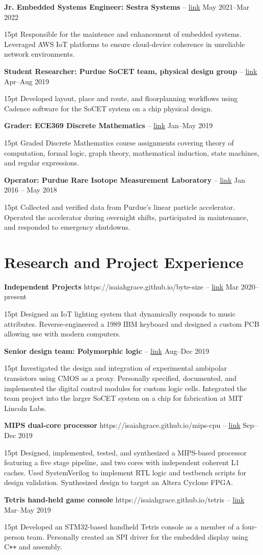 \documentclass[10pt,letterpaper]{article}
\newcommand{\resumeItem}[4]{
	\begingroup
	\def\link{#2}
	\textbf{#1}
	\ifx\link\empty \else 
		-- \href{#2}{link}
	\fi
	\hfill #3\\
	\begin{adjustwidth}{15pt}{}
	#4
	\end{adjustwidth}
	\endgroup
}
\begin{document}
\resumeItem
{Jr. Embedded Systems Engineer: Sestra Systems}
{}
{May 2021--Mar 2022}
{Responsible for the maintence and enhancement of embedded systems. Leveraged AWS IoT platforms to ensure cloud-device coherence in unreliable network environments.}

\resumeItem
{Student Researcher: Purdue SoCET team, physical design group}
{}
{Apr--Aug 2019}
{Developed layout, place and route, and floorplanning workflows using Cadence software for the SoCET system on a chip physical design.}

\resumeItem
{Grader: ECE369 Discrete Mathematics}
{}
{Jan--May 2019}
{Graded Discrete Mathematics course assignments covering theory of computation, formal logic, graph theory, mathematical induction, state machines, and regular expressions.}

\resumeItem
{Operator: Purdue Rare Isotope Measurement Laboratory}
{}
{Jan 2016 -- May 2018}
{Collected and verified data from Purdue's linear particle accelerator. Operated the accelerator during overnight shifts, participated in maintenance, and responded to emergency shutdowns.}

\section*{Research and Project Experience}
\resumeItem
{Independent Projects}
{https://isaiahgrace.github.io/byte-size}
{Mar 2020--present}
{Designed an IoT lighting system that dynamically responds to music attributes. Reverse-engineered a 1989 IBM keyboard and designed a custom PCB allowing use with modern computers.}

\resumeItem
{Senior design team: Polymorphic logic}
{}
{Aug--Dec 2019}
{Investigated the design and integration of experimental ambipolar transistors using CMOS as a proxy. Personally specified, documented, and implemented the digital control modules for custom logic cells. Integrated the team project into the larger SoCET system on a chip for fabrication at MIT Lincoln Labs.}

\resumeItem
{MIPS dual-core processor}
{https://isaiahgrace.github.io/mips-cpu}
{Sep--Dec 2019}
{Designed, implemented, tested, and synthesized a MIPS-based processor featuring a five stage pipeline, and two cores with independent coherent L1 caches. Used SystemVerilog to implement RTL logic and testbench scripts for design validation. Synthesized design to target an Altera Cyclone FPGA.}

\resumeItem
{Tetris hand-held game console}
{https://isaiahgrace.github.io/tetris}
{Mar--May 2019}
{Developed an STM32-based handheld Tetris console as a member of a four-person team. Personally created an SPI driver for the embedded display using C\texttt{++} and assembly.}
\end{document}
